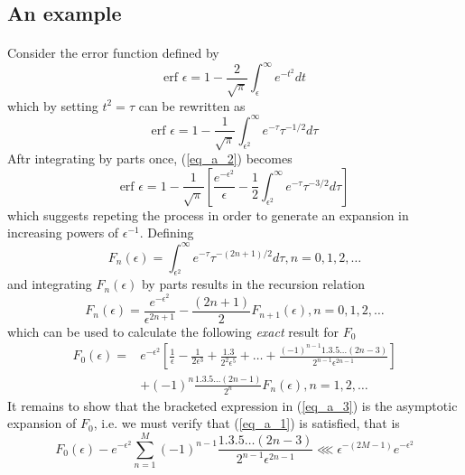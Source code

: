 \documentclass{article}
\begin{document}
\begin{appendices}
\subsection{An example}
%
\paragraph{} Consider the error function defined by
%
\begin{equation}
\textrm{erf }\epsilon=1-\frac{2}{\sqrt{\pi}}\int^\infty_\epsilon e^{-t^2}dt
\end{equation}
%
which by setting $t^2=\tau$ can be rewritten as
%
\begin{equation}
\textrm{erf }\epsilon=1-\frac{1}{\sqrt{\pi}}\int^\infty_{\epsilon^2} e^{-\tau}\tau^{-1/2}d\tau\label{eq_a_2}
\end{equation}
%
Aftr integrating by parts once, (\ref{eq_a_2}) becomes
%
\begin{equation}
\textrm{erf }\epsilon=1-\frac{1}{\sqrt{\pi}}\left[\frac{e^{-\epsilon^2}}{\epsilon}-\frac{1}{2}\int^\infty_{\epsilon^2} e^{-\tau}\tau^{-3/2}d\tau\right]
\end{equation}
%
which suggests repeting the process in order to generate an expansion in increasing powers of $\epsilon^{-1}$. Defining
%
\begin{equation}
F_n(\epsilon)=\int^\infty_{\epsilon^2} e^{-\tau}\tau^{-(2n+1)/2}d\tau, n=0, 1, 2, \ldots
\end{equation}
%
and integrating $F_n(\epsilon)$ by parts results in the recursion relation
%
\begin{equation}
F_n(\epsilon)=\frac{e^{-\epsilon^2}}{\epsilon^{2n+1}} - \frac{(2n+1)}{2}F_{n+1}(\epsilon), n=0, 1, 2, \ldots
\end{equation}
%
which can be used to calculate the following \emph{exact} result for $F_0$
%
\begin{eqnarray}
%
F_0(\epsilon)= & e^{-\epsilon^2}\left[\frac{1}{\epsilon}-\frac{1}{2\epsilon^3} + \frac{1.3}{2^2\epsilon^5} + \ldots + \frac{(-1)^{n-1}1.3.5\ldots(2n-3)}{2^{n-1}\epsilon^{2n-1}}\right]\nonumber \\
& +(-1)^n\frac{1.3.5\ldots(2n - 1)}{2^n}F_n(\epsilon), n = 1, 2, \ldots\label{eq_a_3}
%
\end{eqnarray}
%
It remains to show that the bracketed expression in (\ref{eq_a_3}) is the asymptotic expansion of $F_0$, i.e. we must verify that (\ref{eq_a_1}) is satisfied, that is
%
\begin{equation}
F_0(\epsilon) - e^{-\epsilon^2}\sum^M_{n=1}(-1)^{n-1}\frac{1.3.5\ldots(2n-3)}{2^{n-1}\epsilon^{2n-1}}\lll\epsilon^{-(2M-1)}e^{-\epsilon^2}

\end{equation}
\end{appendices}
\end{document}
